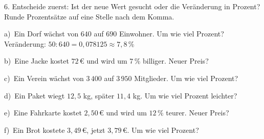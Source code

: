 \documentclass[11pt]{article}
\newcommand{\grau}[1]{{\color{mbgrau}#1}}
\begin{document}
\begin{pfaufg}{}{6.}{}
Entscheide zuerst: Ist der neue Wert gesucht oder die Veränderung in Prozent? Runde Prozentsätze auf eine Stelle nach dem Komma.\par\medskip
\grau{a)\ Ein Dorf wächst von $640$ auf $690$ Einwohner. Um wie viel Prozent?\quad Veränderung: $50 : 640 = 0{,}078125 \approx 7{,}8\,\%$}\par\medskip
\noindent\begin{minipage}[t]{0.48\linewidth}
b)\ Eine Jacke kostet $72\,€$ und wird um $7\,\%$ billiger. Neuer Preis?
\end{minipage}\hfill
\begin{minipage}[t]{0.48\linewidth}
c)\ Ein Verein wächst von $3\,400$ auf $3\,950$ Mitglieder. Um wie viel Prozent?
\end{minipage}
\noindent\begin{minipage}[t]{0.48\linewidth}
d)\ Ein Paket wiegt $12{,}5$ kg, später $11{,}4$ kg. Um wie viel Prozent leichter?
\end{minipage}\hfill
\begin{minipage}[t]{0.48\linewidth}
e)\ Eine Fahrkarte kostet $2{,}50\,€$ und wird um $12\,\%$ teurer. Neuer Preis?
\end{minipage}
\noindent\begin{minipage}[t]{0.48\linewidth}
f)\ Ein Brot kostete $3{,}49\,€$, jetzt $3{,}79\,€$. Um wie viel Prozent?
\end{minipage}
\end{pfaufg}
\end{document}
